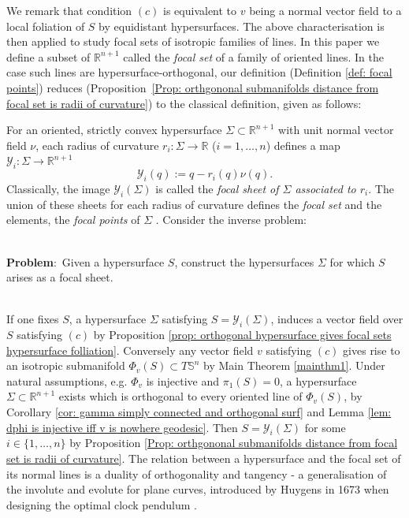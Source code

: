 \documentclass[12pt]{amsart}
\theoremstyle{plain}
\theoremstyle{definition}
\def\R{\mathbb{R}}
\def\S{\mathbb{S}}
\numberwithin{equation}{section}
\begin{document}
 We remark that condition $(c)$ is equivalent to $v$ being a normal vector field to a local foliation of $S$ by equidistant hypersurfaces. The above characterisation is then applied to study focal sets of isotropic families of lines. In this paper we define a subset of $\R^{n+1}$ called the \textit{focal set} of a family of oriented lines. In the case such lines are hypersurface-orthogonal, our definition (Definition \ref{def: focal points}) reduces (\mbox{Proposition \ref{Prop: orthgononal submanifolds distance from focal set is radii of curvature}}) to the classical definition, given as follows:
 
 
 For an oriented, strictly convex hypersurface $\Sigma\subset\R^{n+1}$ with unit normal vector field $\nu$, each radius of curvature $r_i:\Sigma\to \R$ ($i=1,\ldots,n$) defines a map $\mathcal{Y}_i:\Sigma\to\R^{n+1}$
\begin{equation} \label{eq: maps from surface to focal set}
    \mathcal{Y}_i(q):=q-r_i(q)\nu(q).
    \end{equation}
Classically, the image $\mathcal{Y}_i(\Sigma)$ is called the \textit{focal sheet of $\Sigma$ associated to $r_i$}. The union of these sheets for each radius of curvature defines the \textit{focal set} and the elements, the \textit{focal points} of $\Sigma$ \cite{CR78}. Consider the inverse problem:
\\ \hfill \\
\begin{minipage}{\linewidth}
\textbf{Problem}:~Given a hypersurface $S$, construct the hypersurfaces $\Sigma$ for which $S$ arises as a focal sheet.
\end{minipage}\\

If one fixes $S$, a hypersurface $\Sigma$ satisfying $S=\mathcal{Y}_i(\Sigma)$, induces a vector field over $S$ satisfying $(c)$ by Proposition \ref{prop: orthogonal hypersurface gives focal sets hypersurface folliation}. Conversely any vector field $v$ satisfying $(c)$ gives rise to an isotropic submanifold $\Phi_v(S) \subset T\S^n$ by Main Theorem \ref{mainthm1}. Under natural assumptions, e.g. $\Phi_v$ is injective and $\pi_1(S)=0$, a hypersurface $\Sigma\subset\R^{n+1}$ exists which is orthogonal to every oriented line of $\Phi_v(S)$, by Corollary \ref{cor: gamma simply connected and orthogonal surf} and Lemma \ref{lem: dphi is injective iff v is nowhere geodesic}. Then $S=\mathcal{Y}_i(\Sigma)$ for some $i\in\{1,\ldots,n\}$ by Proposition \ref{Prop: orthgononal submanifolds distance from focal set is radii of curvature}. The relation between a hypersurface and the focal set of its normal lines is a duality of orthogonality and tangency - a generalisation of the involute and evolute for plane curves, introduced by Huygens in 1673 when designing the optimal clock pendulum \cite{Arnold94} \cite{Arnold95} \cite{Huygens1673} \cite{Wilczynski16}.\\
\end{document}
